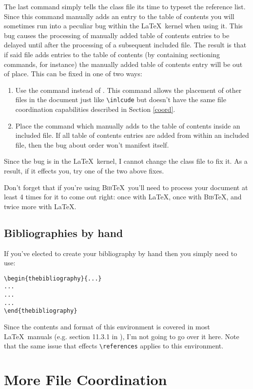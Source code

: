 The last command simply tells the class file its time to typeset the reference list.  Since this command manually adds an entry to the table of contents you will sometimes run into a peculiar bug within the \LaTeX\ kernel when using it.  This bug causes the processing of manually added table of contents entries to be delayed until after the processing of a subsequent included file.  The result is that if said file adds entries to the table of contents (by containing sectioning commands, for instance) the manually added table of contents entry will be out of place.  This can be fixed in one of two ways:
\begin{enumerate}
\item{Use the \verb== command instead of \verb==.  This command allows the placement of other files in the document just like \verb=\inlcude= but doesn't have the same file coordination capabilities described in Section \ref{coord}.}
\item{Place the command which manually adds to the table of contents inside an included file.  If all table of contents entries are added from within an included file, then the bug about order won't manifest itself.}
\end{enumerate}
Since the bug is in the \LaTeX\ kernel, I cannot change the class file to fix it.  As a result, if it effects you, try one of the two above fixes.

Don't forget that if you're using \textsc{Bib}\TeX\ you'll need to process your document at least 4 times for it to come out right: once with \LaTeX, once with \textsc{Bib}\TeX, and twice more with \LaTeX.

\subsection{Bibliographies by hand}
If you've elected to create your bibliography by hand then you simply need to use:
\begin{verbatim}
\begin{thebibliography}{...}
...
...
...
\end{thebibliography}
\end{verbatim}
Since the contents and format of this environment is covered in most \LaTeX\ manuals (e.g. section 11.3.1 in \cite{Kopka:2004}), I'm not going to go over it here.  Note that the same issue that effects \verb=\references= applies to this environment.

\section{More File Coordination}

